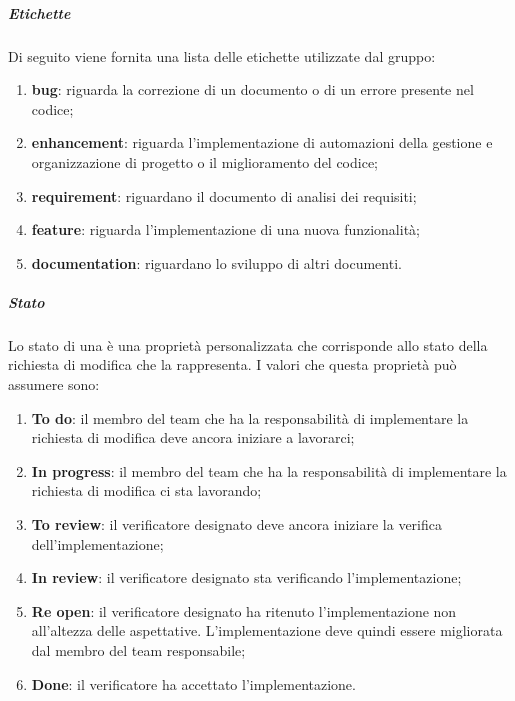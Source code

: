 \subparagraph{Etichette}
Di seguito viene fornita una lista delle etichette utilizzate dal gruppo:
\begin{enumerate}
    \item \textbf{bug}: riguarda la correzione di un documento o di un errore presente nel codice;
    
    \item \textbf{enhancement}: riguarda l'implementazione di automazioni della gestione e organizzazione di progetto o il miglioramento del codice;
    
    \item \textbf{requirement}: riguardano il documento di analisi dei requisiti;
    
    \item \textbf{feature}: riguarda l'implementazione di una nuova funzionalità;

    \item \textbf{documentation}: riguardano lo sviluppo di altri documenti.
\end{enumerate}

\subparagraph{Stato}
Lo stato di una  è una proprietà personalizzata che corrisponde allo stato della richiesta di modifica che la  rappresenta.
I valori che questa proprietà può assumere sono:
\begin{enumerate}
    \item \textbf{To do}: il membro del team che ha la responsabilità di implementare la richiesta di modifica deve ancora iniziare a lavorarci;
    
    \item \textbf{In progress}: il membro del team che ha la responsabilità di implementare la richiesta di modifica ci sta lavorando;
    
    \item \textbf{To review}: il verificatore designato deve ancora iniziare la verifica dell'implementazione;
    
    \item \textbf{In review}: il verificatore designato sta verificando l'implementazione;
    
    \item \textbf{Re open}: il verificatore designato ha ritenuto l'implementazione non all'altezza delle aspettative.
    L'implementazione deve quindi essere migliorata dal membro del team responsabile;
    
    \item \textbf{Done}: il verificatore ha accettato l'implementazione.
\end{enumerate}


